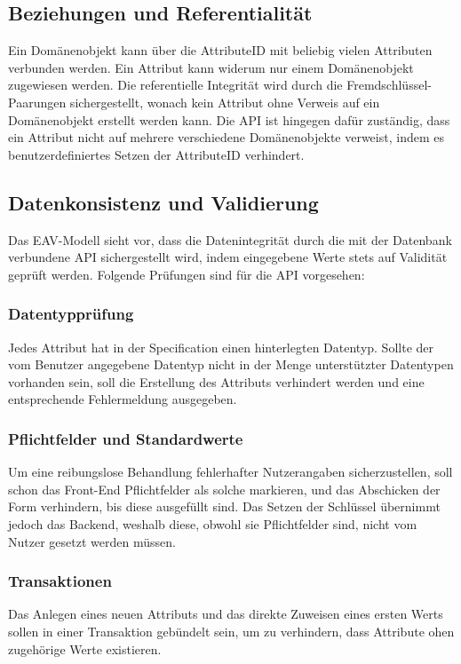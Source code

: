 \subsection{Beziehungen und Referentialität}
Ein Domänenobjekt kann über die AttributeID mit beliebig vielen Attributen verbunden werden. Ein Attribut kann widerum nur einem Domänenobjekt zugewiesen werden. 
Die referentielle Integrität wird durch die Fremdschlüssel-Paarungen sichergestellt, wonach kein Attribut ohne Verweis auf ein Domänenobjekt erstellt werden kann. 
Die API ist hingegen dafür zuständig, dass ein Attribut nicht auf mehrere verschiedene Domänenobjekte verweist, indem es benutzerdefiniertes Setzen der AttributeID verhindert.
\subsection{Datenkonsistenz und Validierung}
Das EAV-Modell sieht vor, dass die Datenintegrität durch die mit der Datenbank verbundene API sichergestellt wird, indem eingegebene Werte stets auf Validität geprüft werden.
Folgende Prüfungen sind für die API vorgesehen:
\subsubsection{Datentypprüfung}
Jedes Attribut hat in der Specification einen hinterlegten Datentyp. Sollte der vom Benutzer angegebene Datentyp nicht in der Menge unterstützter Datentypen vorhanden sein,
soll die Erstellung des Attributs verhindert werden und eine entsprechende Fehlermeldung ausgegeben.
\subsubsection{Pflichtfelder und Standardwerte}
Um eine reibungslose Behandlung fehlerhafter Nutzerangaben sicherzustellen, soll schon das Front-End Pflichtfelder als solche markieren, und das Abschicken der Form verhindern,
bis diese ausgefüllt sind. Das Setzen der Schlüssel übernimmt jedoch das Backend, weshalb diese, obwohl sie Pflichtfelder sind, nicht vom Nutzer gesetzt werden müssen.
\subsubsection{Transaktionen}
Das Anlegen eines neuen Attributs und das direkte Zuweisen eines ersten Werts sollen in einer Transaktion gebündelt sein, um zu verhindern, dass Attribute ohen zugehörige Werte 
existieren.

